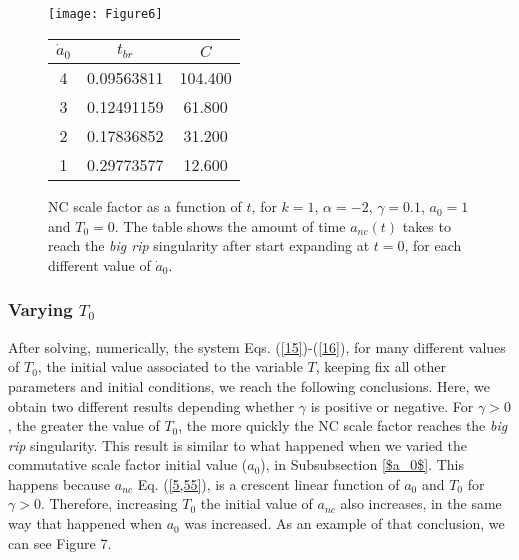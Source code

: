 \documentclass[12pt]{article}
\newcommand{\0}{{(0)}}
\newcommand{\1}{{(1)}}
\newcommand{\2}{{(2)}}
\begin{document}
{\begin{figure}[!htb]
	\centering
	\begin{minipage}[c]{0.49\linewidth}
		\centering
		\texttt{[image: Figure6]}
	\end{minipage}
	\hfill
	\begin{minipage}[c]{0.49\linewidth}
		\centering
		\begin{tabular}{ccc}\hline
			$\dot{a}_0$ & $t_{br}$ & $C$ \\ \hline
			4 & 0.09563811 & 104.400 \\
			3 & 0.12491159 & 61.800 \\
			2 & 0.17836852 & 31.200 \\
			1 & 0.29773577 & 12.600 \\ \hline
		\end{tabular}
	\end{minipage}
	\caption{NC scale factor as a function of $t$, for $k = 1$, $\alpha = -2$, $\gamma = 0.1$, $a_0 = 1$ and $T_0 = 0$.
	The table shows the amount of time $a_{nc}(t)$ takes to reach the {\it big rip} singularity after start expanding at $t=0$, 
		for each different value of $\dot{a}_0$.}\label{fig6}
\end{figure}

\subsubsection{Varying $T_0$}

After solving, numerically, the system Eqs. (\ref{15})-(\ref{16}), for many different values of $T_0$, the initial value associated to 
the variable $T$, keeping fix all other parameters and initial conditions, we reach the following conclusions. Here, we obtain two
different results depending whether $\gamma$ is positive or negative. For $\gamma > 0$, the greater the value of $T_0$, the more quickly 
the NC scale factor reaches the {\it big rip} singularity. This result is similar to what happened when we varied the commutative
scale factor initial value ($a_0$), in Subsubsection \ref{$a_0$}. This happens because $a_{nc}$ Eq. (\ref{5,55}), is a crescent linear function of $a_0$ and $T_0$
for $\gamma > 0$. Therefore, increasing $T_0$ the initial value of $a_{nc}$ also increases, in the same way that happened when $a_0$ was
increased. As an example of that conclusion, we can see Figure 7.

}
\end{document}
